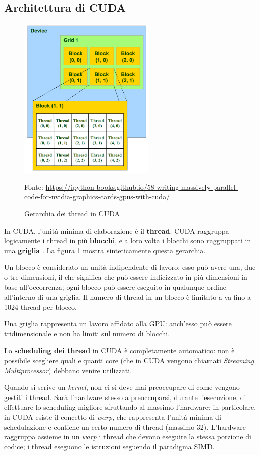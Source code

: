 \documentclass[12pt,a4paper,openright,twoside]{report}
\newcommand{\source}[1]{\vspace{-10pt} \caption*{\scriptsize Fonte: {#1}} }
\begin{document}
\subsection{Architettura di CUDA}

\begin{figure}[h]
    \centering
    \includegraphics[width=6.5cm]{grids-and-blocks.png}
    \caption{Gerarchia dei thread in CUDA}
    \source{\url{https://ipython-books.github.io/58-writing-massively-parallel-code-for-nvidia-graphics-cards-gpus-with-cuda/}}
    \label{img:grids-and-blocks}
\end{figure}

In CUDA, l'unità minima di elaborazione è il \textbf{thread}. CUDA raggruppa logicamente i thread in più \textbf{blocchi}, e a loro volta i blocchi sono raggruppati in una \textbf{griglia} \cite{cudaguide}. La figura \ref{img:grids-and-blocks} mostra sinteticamente questa gerarchia.

Un blocco è considerato un unità indipendente di lavoro: esso può avere una, due o tre dimensioni, il che significa che può essere indicizzato in più dimensioni in base all'occorrenza; ogni blocco può essere eseguito in qualunque ordine all'interno di una griglia. Il numero di thread in un blocco è limitato a va fino a 1024 thread per blocco.

Una griglia rappresenta un lavoro affidato alla GPU: anch'esso può essere tridimensionale e non ha limiti sul numero di blocchi.

Lo \textbf{scheduling dei thread} in CUDA è completamente automatico: non è possibile scegliere quali e quanti core (che in CUDA vengono chiamati \textit{Streaming Multiprocessor}) debbano venire utilizzati.

Quando si scrive un \textit{kernel}, non ci si deve mai preoccupare di come vengono gestiti i thread. Sarà l'hardware stesso a preoccuparsi, durante l'esecuzione, di effettuare lo scheduling migliore sfruttando al massimo l'hardware: in particolare, in CUDA esiste il concetto di \textit{warp}, che rappresenta l'unità minima di schedulazione e contiene un certo numero di thread (massimo 32). L'hardware raggruppa assieme in un \textit{warp} i thread che devono eseguire la stessa porzione di codice; i thread eseguono le istruzioni seguendo il paradigma SIMD.
\end{document}
